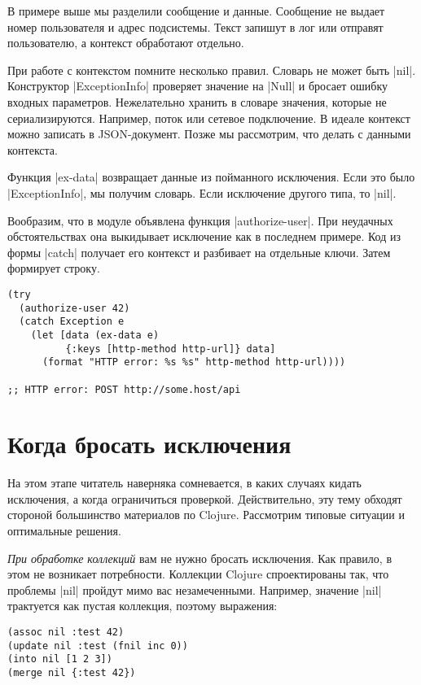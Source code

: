 В примере выше мы разделили сообщение и данные. Сообщение не выдает номер
пользователя и адрес подсистемы. Текст запишут в лог или отправят пользователю,
а контекст обработают отдельно.

При работе с контекстом помните несколько правил. Словарь не может быть
\spverb|nil|. Конструктор \spverb|ExceptionInfo| проверяет значение на \spverb|Null| и бросает ошибку
входных параметров. Нежелательно хранить в словаре значения, которые не
сериализируются. Например, поток или сетевое подключение. В идеале контекст
можно записать в JSON-документ. Позже мы рассмотрим, что делать с данными
контекста.

Функция \spverb|ex-data| возвращает данные из пойманного исключения. Если это было
\spverb|ExceptionInfo|, мы получим словарь. Если исключение другого типа, то \spverb|nil|.

Вообразим, что в модуле объявлена функция \spverb|authorize-user|. При неудачных
обстоятельствах она выкидывает исключение как в последнем примере. Код из формы
\spverb|catch| получает его контекст и разбивает на отдельные ключи. Затем формирует
строку.

\begin{verbatim}
(try
  (authorize-user 42)
  (catch Exception e
    (let [data (ex-data e)
          {:keys [http-method http-url]} data]
      (format "HTTP error: %s %s" http-method http-url))))

;; HTTP error: POST http://some.host/api
\end{verbatim}

\section{Когда бросать исключения}

На этом этапе читатель наверняка сомневается, в каких случаях кидать исключения,
а когда ограничиться проверкой. Действительно, эту тему обходят стороной
большинство материалов по Clojure. Рассмотрим типовые ситуации и оптимальные
решения.

\emph{При обработке коллекций} вам не нужно бросать исключения. Как правило, в этом
не возникает потребности. Коллекции Clojure спроектированы так, что проблемы
\spverb|nil| пройдут мимо вас незамеченными. Например, значение \spverb|nil| трактуется как
пустая коллекция, поэтому выражения:

\begin{verbatim}
(assoc nil :test 42)
(update nil :test (fnil inc 0))
(into nil [1 2 3])
(merge nil {:test 42})
\end{verbatim}

